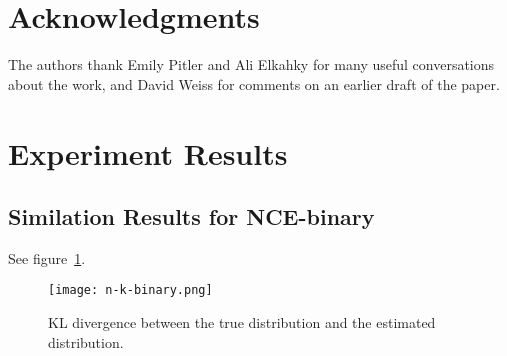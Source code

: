\documentclass[11pt,a4paper]{article}
\begin{document}
\section*{Acknowledgments}

The authors thank Emily Pitler and Ali Elkahky for many useful conversations about the work, 
and David Weiss for comments on an earlier draft of the paper.













 \clearpage{}\appendix
\section{Experiment Results}
\subsection{Similation Results for NCE-binary}
\label{sec:sim-binary}
See figure~\ref{fig:sim-binary}.
\begin{figure}[h]
\texttt{[image: n-k-binary.png]}
\caption{KL divergence between the true distribution and the estimated distribution.}
\label{fig:sim-binary}
\end{figure}
\end{document}

